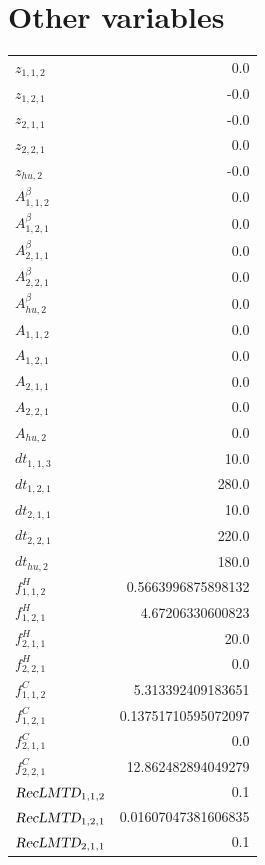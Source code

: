 \documentclass{article}%
\makeatletter
\let\mcnewpage=\newpage%
\newcommand{\TrickSupertabularIntoMulticols}{%
\renewcommand\newpage{%
\if@firstcolumn%
\hrule width\linewidth height0pt%
\columnbreak%
\else%
\mcnewpage%
\fi%
}%
}%
\makeatother
\begin{document}
\section{Other variables}%
\thispagestyle{plain}%
\begin{multicols*}{3}%
\TrickSupertabularIntoMulticols%
%
\begin{supertabular}{lr}%
	$z_{1,1,2}$ & 0.0 \\%
	$z_{1,2,1}$ & -0.0 \\%
	$z_{2,1,1}$ & -0.0 \\%
	$z_{2,2,1}$ & 0.0 \\%
	$z_{hu,2}$ & -0.0 \\%
	$A_{1,1,2}^{\beta}$ & 0.0 \\%
	$A_{1,2,1}^{\beta}$ & 0.0 \\%
	$A_{2,1,1}^{\beta}$ & 0.0 \\%
	$A_{2,2,1}^{\beta}$ & 0.0 \\%
	$A_{hu,2}^{\beta}$ & 0.0 \\%
	$A_{1,1,2}$ & 0.0 \\%
	$A_{1,2,1}$ & 0.0 \\%
	$A_{2,1,1}$ & 0.0 \\%
	$A_{2,2,1}$ & 0.0 \\%
	$A_{hu,2}$ & 0.0 \\%
	$dt_{1,1,3}$ & 10.0 \\%
	$dt_{1,2,1}$ & 280.0 \\%
	$dt_{2,1,1}$ & 10.0 \\%
	$dt_{2,2,1}$ & 220.0 \\%
	$dt_{hu,2}$ & 180.0 \\%
	$f_{1,1,2}^{H}$ & 0.5663996875898132 \\%
	$f_{1,2,1}^{H}$ & 4.67206330600823 \\%
	$f_{2,1,1}^{H}$ & 20.0 \\%
	$f_{2,2,1}^{H}$ & 0.0 \\%
	$f_{1,1,2}^{C}$ & 5.313392409183651 \\%
	$f_{1,2,1}^{C}$ & 0.13751710595072097 \\%
	$f_{2,1,1}^{C}$ & 0.0 \\%
	$f_{2,2,1}^{C}$ & 12.862482894049279 \\%
	$\textsl{RecLMTD}_{1,1,2}$ & 0.1 \\%
	$\textsl{RecLMTD}_{1,2,1}$ & 0.01607047381606835 \\%
	$\textsl{RecLMTD}_{2,1,1}$ & 0.1 \\%

\end{supertabular}
\end{multicols*}
\end{document}
